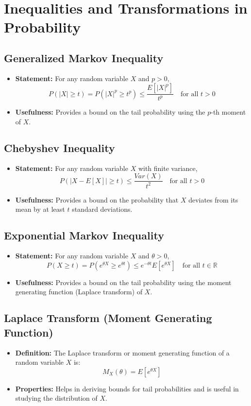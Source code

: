 \documentclass{article}
\begin{document}
\section*{Inequalities and Transformations in Probability}

\subsection*{Generalized Markov Inequality}
\begin{itemize}
    \item \textbf{Statement:} For any random variable $X$ and $p > 0$,
    \[
    P(|X| \ge t) = P(|X|^p \ge t^p) \le \frac{E[|X|^p]}{t^p} \quad \text{for all } t > 0
    \]
    \item \textbf{Usefulness:} Provides a bound on the tail probability using the $p$-th moment of $X$.
\end{itemize}

\subsection*{Chebyshev Inequality}
\begin{itemize}
    \item \textbf{Statement:} For any random variable $X$ with finite variance,
    \[
    P(|X - E[X]| \ge t) \le \frac{Var(X)}{t^2} \quad \text{for all } t > 0
    \]
    \item \textbf{Usefulness:} Provides a bound on the probability that $X$ deviates from its mean by at least $t$ standard deviations.
\end{itemize}

\subsection*{Exponential Markov Inequality}
\begin{itemize}
    \item \textbf{Statement:} For any random variable $X$ and $\theta > 0$,
    \[
    P(X \ge t) = P(e^{\theta X} \ge e^{\theta t}) \le e^{-\theta t} E[e^{\theta X}] \quad \text{for all } t \in \mathbb{R}
    \]
    \item \textbf{Usefulness:} Provides a bound on the tail probability using the moment generating function (Laplace transform) of $X$.
\end{itemize}

\subsection*{Laplace Transform (Moment Generating Function)}
\begin{itemize}
    \item \textbf{Definition:} The Laplace transform or moment generating function of a random variable $X$ is:
    \[
    M_X(\theta) = E[e^{\theta X}]
    \]
    \item \textbf{Properties:} Helps in deriving bounds for tail probabilities and is useful in studying the distribution of $X$.
\end{itemize}
\end{document}
